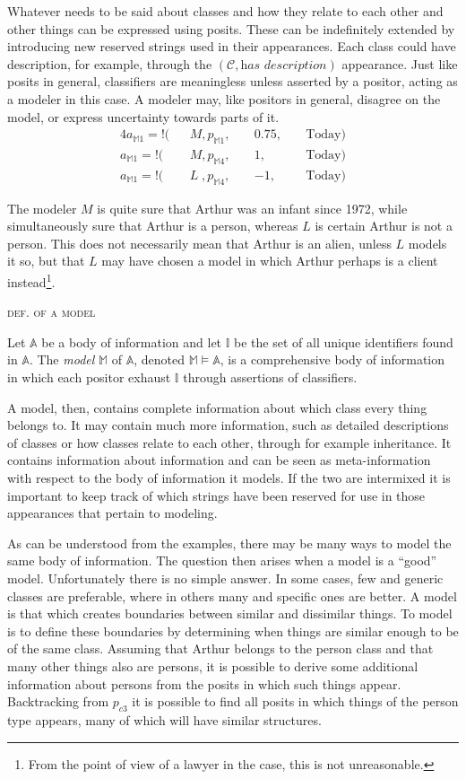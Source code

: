 \documentclass[sfsidenotes,nobib,twoside,symmetric]{tufte-handout}
\newcommand{\assert}{\text{!}}
\newcounter{majorcount}
\newcommand{\deffy}[3]{
	\vspace{2ex}
	\refstepcounter{majorcount} 
	\noindent\textsc{#1}%
	\\\begin{small}
	\noindent #2%
	\label{Def:#3}
	\end{small}
	\vspace{2ex}
}
\begin{document}
Whatever needs to be said about classes and how they relate to each other and other things can be expressed using posits. These can be indefinitely extended by introducing new reserved strings used in their appearances. Each class could have description, for example, through the $(\mathcal{C}, \textit{has description})$ appearance. Just like posits in general, classifiers are meaningless unless asserted by a positor, acting as a modeler in this case. A modeler may, like positors in general, disagree on the model, or express uncertainty towards parts of it. 
\begin{alignat*}{4}
a_{\mathbb{M}1} = \assert(&&M, p_{\mathbb{M}1},\;&& 0.75,\;&& \textrm{Today}) \\
a_{\mathbb{M}1} = \assert(&&M, p_{\mathbb{M}4},\;&& 1,\;&& \textrm{Today}) \\
a_{\mathbb{M}1} = \assert(&&L\;, p_{\mathbb{M}4},\;&& -1,\;&& \textrm{Today}) 
\end{alignat*}

The modeler $M$ is quite sure that Arthur was an infant since 1972, while simultaneously sure that Arthur is a person, whereas $L$ is certain Arthur is not a person. This does not necessarily mean that Arthur is an alien, unless $L$ models it so, but that $L$ may have chosen a model in which Arthur perhaps is a client instead\footnote{From the point of view of a lawyer in the case, this is not unreasonable.}. 

\deffy{def. of a model}{%
Let $\mathbb{A}$ be a body of information and let $\mathbb{I}$ be the set of all unique identifiers found in $\mathbb{A}$. The \emph{model} $\mathbb{M}$ of $\mathbb{A}$, denoted $\mathbb{M} \models \mathbb{A}$, is a comprehensive body of information in which each positor exhaust $\mathbb{I}$ through assertions of classifiers.
}{model}

A model, then, contains complete information about which class every thing belongs to. It may contain much more information, such as detailed descriptions of classes or how classes relate to each other, through for example inheritance. It contains information about information and can be seen as meta-information with respect to the body of information it models. If the two are intermixed it is important to keep track of which strings have been reserved for use in those appearances that pertain to modeling.

As can be understood from the examples, there may be many ways to model the same body of information. The question then arises when a model is a \enquote{good} model. Unfortunately there is no simple answer. In some cases, few and generic classes are preferable, where in others many and specific ones are better. A model is that which creates boundaries between similar and dissimilar things. To model is to define these boundaries by determining when things are similar enough to be of the same class. Assuming that Arthur belongs to the person class and that many other things also are persons, it is possible to derive some additional information about persons from the posits in which such things appear. Backtracking from $p_{c3}$ it is possible to find all posits in which things of the person type appears, many of which will have similar structures.
\end{document}
